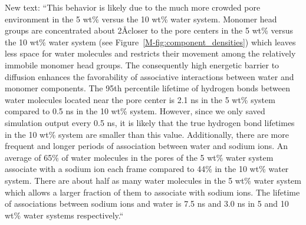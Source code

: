 \documentclass{article}
\begin{document}
\begin{enumerate}
    New text: ``This behavior is likely due to the much more crowded pore environment
    in the 5 wt\% versus the 10 wt\% water system. Monomer head groups are
    concentrated about 2\AA closer to the pore centers in the 5 wt\% versus the 10 
    wt\% water system (see Figure~\ref{M-fig:component_densities})  %
    which leaves less space for water molecules and restricts their movement among the 
    relatively immobile monomer head groups. 
    The consequently high energetic barrier to diffusion enhances the favorability of 
    associative interactions between water and monomer components.
    The 95th percentile lifetime of hydrogen bonds between water molecules located near the
	pore center is 2.1 ns in the 5 wt\% system compared to 0.5 ns in the 10 wt\% system. 
	However, since we only saved simulation output every 0.5 ns, it is likely that the 
	true hydrogen bond lifetimes in the 10 wt\% system are smaller than this value.
	Additionally, there are more frequent and longer periods of association between water
	and sodium ions. An average of 65\% of water molecules in the pores of the 5 wt\% water
	system associate with a sodium ion each frame compared to 44\% in the 10 wt\% water system.
	There are about half as many water molecules in the 5 wt\% water system which allows a 
	larger fraction of them to associate with sodium ions. The lifetime of associations
	between sodium ions and water is 7.5 ns and 3.0 ns in 5 and 10 wt\% water systems respectively.``
	

\end{enumerate}
\end{document}
